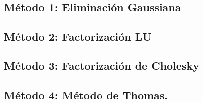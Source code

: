 \documentclass[10pt]{article}
\begin{document}
\newpage

\subsection{Método 1: Eliminación Gaussiana}

\UseRawInputEncoding

\newpage


\subsection{Método 2: Factorización LU}

\UseRawInputEncoding

\newpage

\UseRawInputEncoding

\newpage

\subsection{Método 3: Factorización de Cholesky}

\UseRawInputEncoding


\newpage


\subsection{Método 4: Método de Thomas.}
\end{document}

